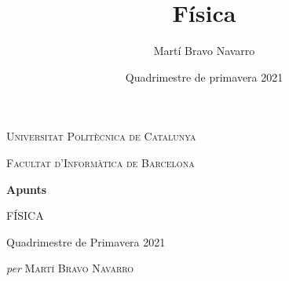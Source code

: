 \documentclass[12pt, a4paper, twoside]{report}
\title{Física}
\author{Martí Bravo Navarro}
\date{Quadrimestre de primavera 2021}
\begin{document}
\begin{titlepage}
	\centering
	\vspace*{\baselineskip} 
    {\scshape Universitat Politècnica de Catalunya}
    \vspace{0.25\baselineskip}

    {\scshape\Large Facultat d'Informàtica de Barcelona}
	\vspace{10\baselineskip}

    \textbf{\Large Apunts}
    \vspace{0.75\baselineskip}

	{\LARGE FÍSICA\\}

	\vspace{0.75\baselineskip}
	\vspace{10\baselineskip}
    Quadrimestre de Primavera 2021
	\vspace*{3\baselineskip} 

    \textit{per}
	\vspace{0.5\baselineskip}
	{\scshape\Large Martí Bravo Navarro}
	\vspace{0.5\baselineskip}
	\vfill
	

\end{titlepage}
\end{document}
